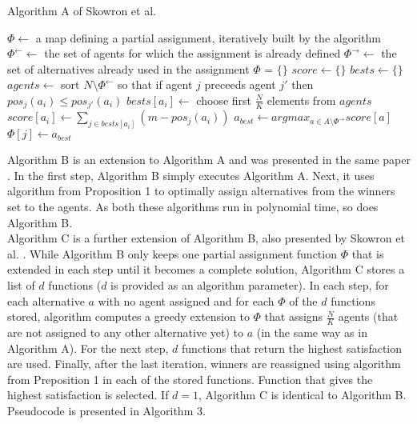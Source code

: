 \begin{algorithm}
\caption{Algorithm A of Skowron et al. \cite{1}}\label{euclid}
\begin{algorithmic}[1]
		\State $\Phi \gets$ a map defining a partial assignment, iteratively built by the algorithm
		\State $\Phi^{\leftarrow} \gets$ the set of agents for which the assignment is already defined
		\State $\Phi^{\rightarrow} \gets$ the set of alternatives already used in the assignment%
		\State $\Phi$ = $\{\}$
			\State $score \gets \{\}$
			\State $bests \gets \{\}$
				\State $agents \gets$ sort $N \setminus \Phi^{\leftarrow}$ so that if agent $j$ preceeds agent $j'$ then $pos_{j}(a_{i}) \leq pos_{j'}(a_{i})$
				\State $bests[a_{i}] \gets$ choose first $\frac{N}{K}$ elements from $agents$
				\State $score[a_{i}] \gets \sum_{j \in bests[a_{i}]}(m - pos_{j}(a_{i}))$
			\EndFor
			\State $a_{best} \gets argmax_{a \in A \setminus \Phi^{\rightarrow}} score[a]$
				\State $\Phi[j] \gets a_{best}$
			\EndFor
		\EndFor
	\EndProcedure
\end{algorithmic}
\end{algorithm}

Algorithm B is an extension to Algorithm A and was presented in the same paper \cite{1}. In the first step, Algorithm B simply executes Algorithm A. Next, it uses algorithm from Proposition 1 to optimally assign alternatives from the winners set to the agents. As both these algorithms run in polynomial time, so does Algorithm B.
\\

Algorithm C is a further extension of Algorithm B, also presented by Skowron et al. \cite{1}. While Algorithm B only keeps one partial assignment function $\Phi$ that is extended in each step until it becomes a complete solution, Algorithm C stores a list of $d$ functions ($d$ is provided as an algorithm parameter). In each step, for each alternative $a$ with no agent assigned and for each $\Phi$ of the $d$ functions stored, algorithm computes a greedy extension to $\Phi$ that assigns $\frac{N}{K}$ agents (that are not assigned to any other alternative yet) to $a$ (in the same way as in Algorithm A). For the next step, $d$ functions that return the highest satisfaction are used. Finally, after the last iteration, winners are reassigned using algorithm from Preposition 1 in each of the stored functions. Function that gives the highest satisfaction is selected. If $d = 1$, Algorithm C is identical to Algorithm B. Pseudocode is presented in Algorithm 3.
\\

